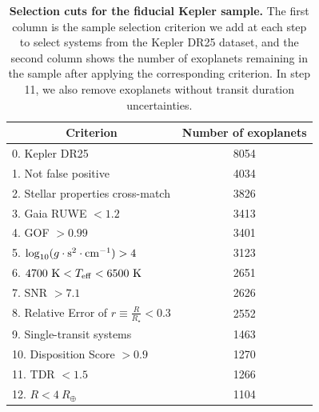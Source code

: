 \documentclass[10pt]{article}
\begin{document}
\begin{table}[!ht]
\centering
\caption{
\textbf{Selection cuts for the fiducial Kepler sample.}
The first column is the sample selection criterion we add at each step to select systems from the Kepler DR25 dataset, and the second column shows the number of exoplanets remaining in the sample after applying the corresponding criterion.
In step 11, we also remove exoplanets without transit duration uncertainties.
}
\begin{tabular}{lc}
\\
\hline
\multicolumn{1}{c}{Criterion} & Number of exoplanets \\
\hline
0. Kepler DR25   & 8054 \\
1. Not false positive  & 4034 \\
2. Stellar properties cross-match\cite{2020AJ....159..280B} & 3826\\
3. Gaia RUWE $<1.2$ & 	3413 \\
4. GOF $>0.99$ & 	3401\\
5. $\log_{10}(g\cdot{\rm s}^2\cdot{\rm cm}^{-1})>4$  & 3123 \\
6. $4700~{\rm K} < T_{\rm eff} < 6500~{\rm K}$  & 2651 \\
7. SNR $>7.1$ & 2626 \\
8. Relative Error of $r \equiv \frac{R}{R_{\star}} < 0.3$  & 2552 \\
9. Single-transit systems & 1463 \\
10. Disposition Score $>0.9$ & 1270 \\
11. TDR $<1.5$ & 1266 \\
12. $R<4~R_\oplus$ & 1104 \\
\hline
\end{tabular}
\label{ts1}
\end{table}
\end{document}
